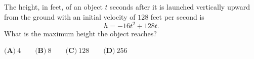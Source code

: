 The height, in feet, of an object $t$ seconds after it is launched vertically upward from the ground with an initial velocity of $128$ feet per second is
\[
h=-16t^2+128t .
\]
What is the maximum height the object reaches?

$\textbf{(A)}\ 4\qquad\textbf{(B)}\ 8\qquad\textbf{(C)}\ 128\qquad\textbf{(D)}\ 256$
